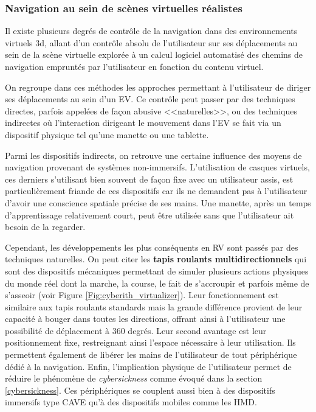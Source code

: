 \subsubsection{Navigation au sein de scènes virtuelles réalistes}

Il existe plusieurs degrés de contrôle de la navigation dans des environnements virtuels 3d, allant d'un contrôle absolu de l'utilisateur sur ses déplacements au sein de la scène virtuelle explorée à un calcul logiciel automatisé des chemins de navigation empruntés par l'utilisateur en fonction du contenu virtuel.


On regroupe dans ces méthodes les approches permettant à l'utilisateur de diriger ses déplacements au sein d'un EV. Ce contrôle peut passer par des techniques directes, parfois appelées de façon abusive <<naturelles>>, ou des techniques indirectes où l'interaction dirigeant le mouvement dans l'EV se fait via un dispositif physique tel qu'une manette ou une tablette.

Parmi les dispositifs indirects, on retrouve une certaine influence des moyens de navigation provenant de systèmes non-immersifs. L'utilisation de casques virtuels, ces derniers s'utilisant bien souvent de façon fixe avec un utilisateur assis, est particulièrement friande de ces dispositifs car ils ne demandent pas à l'utilisateur d'avoir une conscience spatiale précise de ses mains. Une manette, après un temps d'apprentissage relativement court, peut être utilisée sans que l'utilisateur ait besoin de la regarder. 

Cependant, les développements les plus conséquents en RV sont passés par des techniques naturelles. 
On peut citer les \textbf{tapis roulants multidirectionnels} qui sont des dispositifs mécaniques permettant de simuler plusieurs actions physiques du monde réel dont la marche, la course, le fait de s'accroupir et parfois même de s'asseoir (voir Figure \ref{Fig:cyberith_virtualizer}). Leur fonctionnement est similaire aux tapis roulants standards mais la grande différence provient de leur capacité à bouger dans toutes les directions, offrant ainsi à l'utilisateur une possibilité de déplacement à 360 degrés. Leur second avantage est leur positionnement fixe, restreignant ainsi l'espace nécessaire à leur utilisation. Ils permettent également de libérer les mains de l'utilisateur de tout périphérique dédié à la navigation. Enfin, l'implication physique de l'utilisateur permet de réduire le phénomène de \textit{cybersickness} comme évoqué dans la section \ref{cybersickness}.
Ces périphériques se couplent aussi bien à des dispositifs immersifs type CAVE qu'à des dispositifs mobiles comme les HMD.

